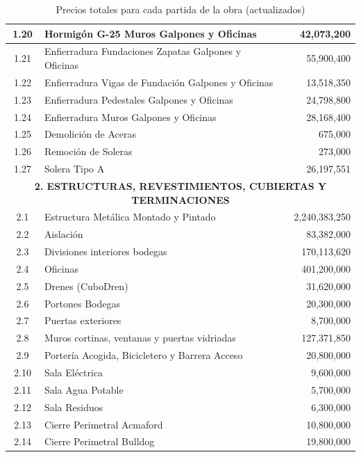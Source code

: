 \documentclass{article} %
\begin{document}
\begin{table}[H]
\begin{tabular}{|c|l|r|}
    1.20 & Hormigón G-25 Muros Galpones y Oficinas & 42,073,200 \\ \hline
    1.21 & Enfierradura Fundaciones Zapatas Galpones y Oficinas & 55,900,400 \\ \hline
    1.22 & Enfierradura Vigas de Fundación Galpones y Oficinas & 13,518,350 \\ \hline
    1.23 & Enfierradura Pedestales Galpones y Oficinas & 24,798,800 \\ \hline
    1.24 & Enfierradura Muros Galpones y Oficinas & 28,168,400 \\ \hline
    1.25 & Demolición de Aceras & 675,000 \\ \hline
    1.26 & Remoción de Soleras & 273,000 \\ \hline
    1.27 & Solera Tipo A & 26,197,551 \\ \hline
    \multicolumn{3}{|c|}{\textbf{2. ESTRUCTURAS, REVESTIMIENTOS, CUBIERTAS Y TERMINACIONES}} \\ \hline
    2.1 & Estructura Metálica Montado y Pintado & 2,240,383,250 \\ \hline
    2.2 & Aislación & 83,382,000 \\ \hline
    2.3 & Divisiones interiores bodegas & 170,113,620 \\ \hline
    2.4 & Oficinas & 401,200,000 \\ \hline
    2.5 & Drenes (CuboDren) & 31,620,000 \\ \hline
    2.6 & Portones Bodegas & 20,300,000 \\ \hline
    2.7 & Puertas exteriores & 8,700,000 \\ \hline
    2.8 & Muros cortinas, ventanas y puertas vidriadas & 127,371,850 \\ \hline
    2.9 & Portería Acogida, Bicicletero y Barrera Acceso & 20,800,000 \\ \hline
    2.10 & Sala Eléctrica & 9,600,000 \\ \hline
    2.11 & Sala Agua Potable & 5,700,000 \\ \hline
    2.12 & Sala Residuos & 6,300,000 \\ \hline
    2.13 & Cierre Perimetral Acmaford & 10,800,000 \\ \hline
    2.14 & Cierre Perimetral Bulldog & 19,800,000 \\ \hline
    \end{tabular}
    \caption{Precios totales para cada partida de la obra (actualizados)}
    \label{tabla-precios-totales}
\end{table}
\end{document}
